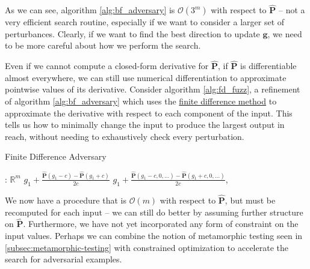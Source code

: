 \documentclass[12pt,initial,twoside,maitrise]{dms}
\numberwithin{equation}{section}
\numberwithin{table}{chapter}
\numberwithin{figure}{chapter}
\begin{document}
As we can see, algorithm \autoref{alg:bf_adversary} is $\mathcal{O}(3^m)$ with respect to $\mathbf{\hat P}$ -- not a very efficient search routine, especially if we want to consider a larger set of perturbances. Clearly, if we want to find the best direction to update $\mathbf g$, we need to be more careful about how we perform the search.

Even if we cannot compute a closed-form derivative for $\mathbf{\hat P}$, if $\mathbf{\hat P}$ is differentiable almost everywhere, we can still use numerical differentiation to approximate pointwise values of its derivative. Consider algorithm \autoref{alg:fd_fuzz}, a refinement of algorithm \autoref{alg:bf_adversary} which uses the \hyperref[sec:fdm]{finite difference method} to approximate the derivative with respect to each component of the input. This tells us how to minimally change the input to produce the largest output in reach, without needing to exhaustively check every perturbation.

\begin{algorithm}[H]
\caption{Finite Difference Adversary}
\label{alg:fd_fuzz}
\begin{algorithmic}[1]
: $\mathbb{R}^m$
 
\State \Return $g_1 + \frac{\mathbf{\hat P}(g_1 - c) - \mathbf{\hat P}(g_1 + c)}{2c}$
\Else {}
\State \Return $g_1 + \frac{\mathbf{\hat P}(g_1 - c, 0, \ldots) - \mathbf{\hat P}(g_1 + c, 0, \ldots)}{2c}$, 
\EndIf
\EndProcedure
\end{algorithmic}
\end{algorithm}

We now have a procedure that is $\mathcal{O}(m)$ with respect to $\mathbf{\hat P}$, but must be recomputed for each input -- we can still do better by assuming further structure on $\mathbf{\hat P}$. Furthermore, we have not yet incorporated any form of constraint on the input values. Perhaps we can combine the notion of metamorphic testing seen in \autoref{subsec:metamorphic-testing} with constrained optimization to accelerate the search for adversarial examples.
\end{document}

